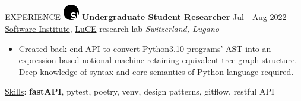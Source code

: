 \documentclass{resume} %
\def\intraexpvspace{0.15cm}
\def\titlelistvspace{-0.15cm}
\begin{document}
\begin{rSection}{EXPERIENCE}
    \includegraphics[width=0.7cm, trim={0cm 10cm 0cm 0cm}]{si-icon.jpg}
    \hspace*{0cm}\textbf{Undergraduate Student Researcher} \hfill Jul - Aug 2022\\
    \hspace*{0.85cm}\href{https://www.si.usi.ch/}{Software Institute},
    \href{https://luce.si.usi.ch/}{LuCE} research lab
    \hfill \textit{Switzerland, Lugano}
    \vspace{\titlelistvspace}\begin{itemize}
        \itemsep -3pt {}
        \item Created back end API to convert Python3.10 programs' AST
              into an expression based notional machine retaining equivalent tree graph structure.
              Deep knowledge of syntax and core semantics of Python language required.
    \end{itemize}
    \vspace*{-0.1cm}\hspace*{0.5cm}\underline{Skills}: \textbf{fastAPI}, pytest, poetry, venv, design patterns, gitflow, restful API
    \vspace{\intraexpvspace}


\end{rSection}
\end{document}
